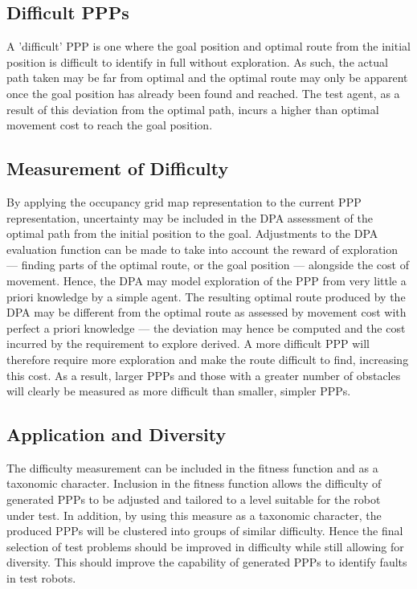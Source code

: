 \documentclass[authoryearcitations]{UoYCSproject}
\begin{document}
\subsection{Difficult PPPs}
\label{sec:pa3_difficult}
A 'difficult' PPP is one where the goal position and optimal route from the initial position is difficult to identify in full without exploration. As such, the actual path taken may be far from optimal and the optimal route may only be apparent once the goal position has already been found and reached. The test agent, as a result of this deviation from the optimal path, incurs a higher than optimal movement cost to reach the goal position.

\subsection{Measurement of Difficulty}
\label{sec:pa3_measurement}
By applying the occupancy grid map representation to the current PPP representation, uncertainty may be included in the DPA assessment of the optimal path from the initial position to the goal. Adjustments to the DPA evaluation function can be made to take into account the reward of exploration --- finding parts of the optimal route, or the goal position --- alongside the cost of movement. Hence, the DPA may model exploration of the PPP from very little a priori knowledge by a simple agent. The resulting optimal route produced by the DPA may be different from the optimal route as assessed by movement cost with perfect a priori knowledge --- the deviation may hence be computed and the cost incurred by the requirement to explore derived. A more difficult PPP will therefore require more exploration and make the route difficult to find, increasing this cost. As a result, larger PPPs and those with a greater number of obstacles will clearly be measured as more difficult than smaller, simpler PPPs.

\subsection{Application and Diversity}
\label{sec:pa3_app_div}
The difficulty measurement can be included in the fitness function and as a taxonomic character. Inclusion in the fitness function allows the difficulty of generated PPPs to be adjusted and tailored to a level suitable for the robot under test. In addition, by using this measure as a taxonomic character, the produced PPPs will be clustered into groups of similar difficulty. Hence the final selection of test problems should be improved in difficulty while still allowing for diversity. This should improve the capability of generated PPPs to identify faults in test robots.
\end{document}
